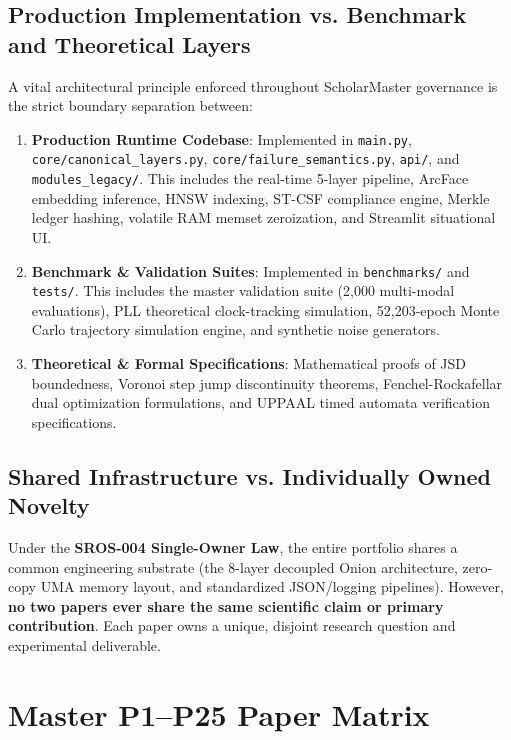 \documentclass[11pt,letterpaper]{article}
\begin{document}
\subsection{Production Implementation vs. Benchmark and Theoretical Layers}
A vital architectural principle enforced throughout ScholarMaster governance is the strict boundary separation between:
\begin{enumerate}
    \item \textbf{Production Runtime Codebase}: Implemented in \texttt{main.py}, \texttt{core/canonical\_layers.py}, \texttt{core/failure\_semantics.py}, \texttt{api/}, and \texttt{modules\_legacy/}. This includes the real-time 5-layer pipeline, ArcFace embedding inference, HNSW indexing, ST-CSF compliance engine, Merkle ledger hashing, volatile RAM memset zeroization, and Streamlit situational UI.
    \item \textbf{Benchmark \& Validation Suites}: Implemented in \texttt{benchmarks/} and \texttt{tests/}. This includes the master validation suite (2,000 multi-modal evaluations), PLL theoretical clock-tracking simulation, 52,203-epoch Monte Carlo trajectory simulation engine, and synthetic noise generators.
    \item \textbf{Theoretical \& Formal Specifications}: Mathematical proofs of JSD boundedness, Voronoi step jump discontinuity theorems, Fenchel-Rockafellar dual optimization formulations, and UPPAAL timed automata verification specifications.
\end{enumerate}

\subsection{Shared Infrastructure vs. Individually Owned Novelty}
Under the \textbf{SROS-004 Single-Owner Law}, the entire portfolio shares a common engineering substrate (the 8-layer decoupled Onion architecture, zero-copy UMA memory layout, and standardized JSON/logging pipelines). However, \textbf{no two papers ever share the same scientific claim or primary contribution}. Each paper owns a unique, disjoint research question and experimental deliverable.


\section{Master P1--P25 Paper Matrix}
\end{document}

